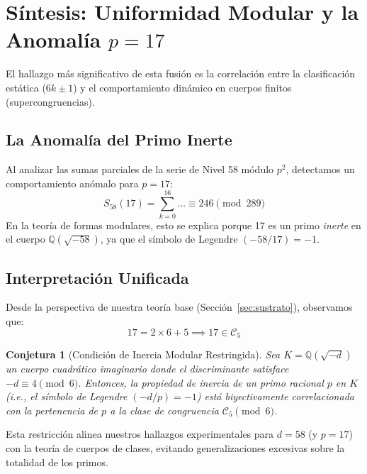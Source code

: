 \documentclass{article}
\theoremstyle{plain}
\newtheorem{conjecture}[theorem]{Conjetura}
\theoremstyle{definition}
\theoremstyle{remark}
\numberwithin{equation}{section}
\begin{document}
\section{Síntesis: Uniformidad Modular y la Anomalía $p=17$}

El hallazgo más significativo de esta fusión es la correlación entre la clasificación estática ($6k \pm 1$) y el comportamiento dinámico en cuerpos finitos (supercongruencias).

\subsection{La Anomalía del Primo Inerte}
Al analizar las sumas parciales de la serie de Nivel 58 módulo $p^2$, detectamos un comportamiento anómalo para $p=17$:
\begin{equation}
S_{58}(17) = \sum_{k=0}^{16} \dots \equiv 246 \pmod{289}
\end{equation}
En la teoría de formas modulares, esto se explica porque 17 es un primo \textit{inerte} en el cuerpo $\mathbb{Q}(\sqrt{-58})$, ya que el símbolo de Legendre $(-58/17) = -1$.

\subsection{Interpretación Unificada}
Desde la perspectiva de nuestra teoría base (Sección~\ref{sec:sustrato}), observamos que:
\[ 17 = 2 \times 6 + 5 \implies 17 \in \mathcal{C}_5 \]

\begin{conjecture}[Condición de Inercia Modular Restringida]
Sea $K = \mathbb{Q}(\sqrt{-d})$ un cuerpo cuadrático imaginario donde el discriminante satisface $-d \equiv 4 \pmod 6$. Entonces, la propiedad de inercia de un primo racional $p$ en $K$ (i.e., el símbolo de Legendre $(-d/p) = -1$) está biyectivamente correlacionada con la pertenencia de $p$ a la clase de congruencia $\mathcal{C}_5 \pmod 6$.
\end{conjecture}
Esta restricción alinea nuestros hallazgos experimentales para $d=58$ (y $p=17$) con la teoría de cuerpos de clases, evitando generalizaciones excesivas sobre la totalidad de los primos.

\end{document}

